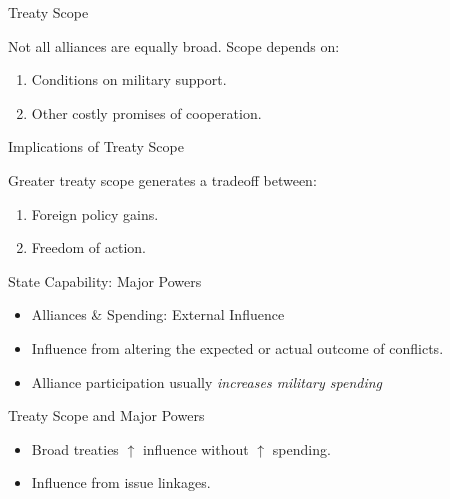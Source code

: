 \documentclass{beamer}
\begin{document}
\begin{frame}{Treaty Scope}

Not all alliances are equally broad. Scope depends on: 

\begin{enumerate} 
\pause
\item Conditions on military support. 
\pause
\item Other costly promises of cooperation. 
\end{enumerate}  

\end{frame}



\begin{frame}{Implications of Treaty Scope}

Greater treaty scope generates a tradeoff between: 

\begin{enumerate} 
\pause
\item Foreign policy gains. 
\pause
\item Freedom of action. 
\end{enumerate}  

\end{frame}



\begin{frame}{State Capability: Major Powers}

\begin{itemize}
\item Alliances \& Spending: External Influence
\pause
\item Influence from altering the expected or actual outcome of conflicts. 
\pause 
\item Alliance participation usually \emph{increases military spending} 
\end{itemize} 


\end{frame}


\begin{frame}{Treaty Scope and Major Powers}

\begin{itemize} 
\item Broad treaties $\uparrow$ influence without $\uparrow$ spending.
\pause
\item Influence from issue linkages. 
\end{itemize} 


\end{frame}
\end{document}
